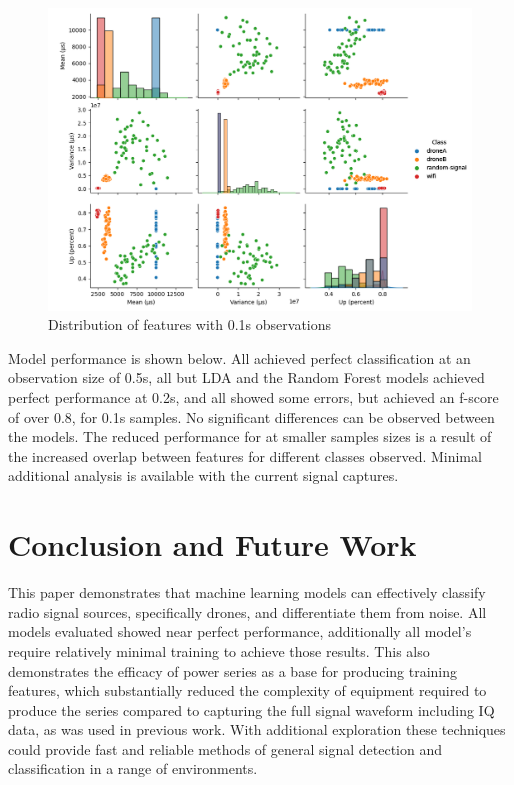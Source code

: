 \documentclass[12pt]{article}
\begin{document}
\begin{figure}[H]
	\includegraphics[width=\linewidth]{img/feature_facets_50_splits.png}
	\caption{Distribution of features with 0.1s observations}
	\label{fig:50split}
\end{figure}

Model performance is shown below. All achieved perfect classification at an observation size of 0.5s, all but LDA and the Random Forest models achieved perfect performance at 0.2s, and all showed some errors, but achieved an f-score of over 0.8, for 0.1s samples. No significant differences can be observed between the models. The reduced performance for at smaller samples sizes is a result of the increased overlap between features for different classes observed. Minimal additional analysis is available with the current signal captures.



\section{Conclusion and Future Work}

This paper demonstrates that machine learning models can effectively classify radio signal sources, specifically drones, and differentiate them from noise. All models evaluated showed near perfect performance, additionally all model's require relatively minimal training to achieve those results. This also demonstrates the efficacy of power series as a base for producing training features, which substantially reduced the complexity of equipment required to produce the series compared to capturing the full signal waveform including IQ data, as was used in previous work. With additional exploration these techniques could provide fast and reliable methods of general signal detection and classification in a range of environments.
\end{document}
